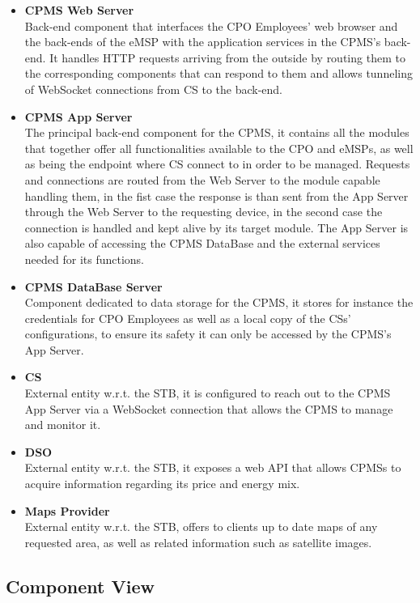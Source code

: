 \documentclass[11pt]{article}
\begin{document}
\begin{itemize}
    \item \textbf{CPMS Web Server} \\
        Back-end component that interfaces the CPO Employees' web browser and the back-ends of the eMSP with the application services in the CPMS's back-end. It handles HTTP requests arriving from the outside by routing them to the corresponding components that can respond to them and allows tunneling of WebSocket connections from CS to the back-end.
    \item \textbf{CPMS App Server} \\
        The principal back-end component for the CPMS, it contains all the modules that together offer all functionalities available to the CPO and eMSPs, as well as being the endpoint where CS connect to in order to be managed. Requests and connections are routed from the Web Server to the module capable handling them, in the fist case the response is than sent from the App Server through the Web Server to the requesting device, in the second case the connection is handled and kept alive by its target module. The App Server is also capable of accessing the CPMS DataBase and the external services needed for its functions.
    \item \textbf{CPMS DataBase Server} \\
        Component dedicated to data storage for the CPMS, it stores for instance the credentials for CPO Employees as well as a local copy of the CSs' configurations, to ensure its safety it can only be accessed by the CPMS's App Server.
    \item \textbf{CS} \\
        External entity w.r.t. the STB, it is configured to reach out to the CPMS App Server via a WebSocket connection that allows the CPMS to manage and monitor it.
    \item \textbf{DSO} \\
        External entity w.r.t. the STB, it exposes a web API that allows CPMSs to acquire information regarding its price and energy mix.
    \item \textbf{Maps Provider} \\
        External entity w.r.t. the STB, offers to clients up to date maps of any requested area, as well as related information such as satellite images.
\end{itemize}

\subsection{Component View}
\end{document}
